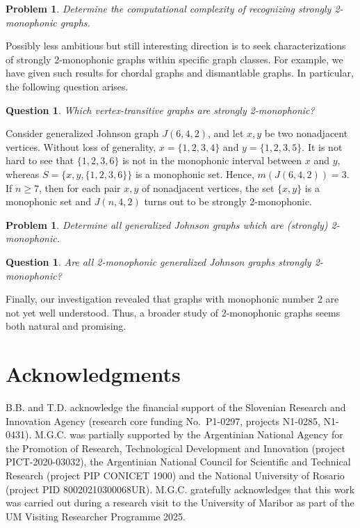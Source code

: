 \documentclass[a4paper,11pt]{article}
\newtheorem{problem}[theorem]{Problem}
\newtheorem{question}[theorem]{Question}
\begin{document}
\begin{problem}
    Determine the computational complexity of recognizing strongly 2-monophonic graphs.
\end{problem}


Possibly less ambitious but still interesting direction is to seek characterizations of strongly 2-monophonic graphs within specific graph classes. For example, we have given such results  for chordal graphs and dismantlable graphs. In particular, the following question arises. 

\begin{question}
    Which vertex-transitive graphs are strongly 2-monophonic? 
\end{question}

Consider generalized Johnson graph $J(6,4,2)$, and let $x,y$ be two nonadjacent vertices. Without loss of generality, $x=\{1,2,3,4\}$ and $y=\{1,2,3,5\}$. It is not hard to see that $\{1,2,3,6\}$ is not in the monophonic interval between $x$ and $y$, whereas $S=\{x,y,\{1,2,3,6\}\}$ is a monophonic set. Hence, $m(J(6,4,2))=3$.
If $n\geq 7$, then for each pair $x,y$ of nonadjacent vertices, the set $\{x,y\}$ is a monophonic set and $J(n,4,2)$ turns out to be strongly 2-monophonic.

\begin{problem}
    Determine all generalized Johnson graphs which are (strongly) 2-monophonic.
\end{problem}
\begin{question}
    Are all 2-monophonic generalized Johnson graphs strongly 2-monophonic?
\end{question}


Finally, our investigation revealed that graphs with monophonic number 2
are not yet well understood. Thus, a broader study of 2-monophonic graphs seems both natural and promising. 






\section*{Acknowledgments}
B.B. and T.D. acknowledge the financial support of the Slovenian Research and Innovation Agency (research core funding No.\ P1-0297, projects N1-0285, N1-0431).
M.G.C. was partially supported by the Argentinian National Agency for the Promotion of Research, Technological Development and Innovation (project PICT-2020-03032), the Argentinian National Council for Scientific and Technical Research (project PIP CONICET 1900) and the National University of Rosario (project PID 80020210300068UR).
M.G.C. gratefully acknowledges that this work was carried out during a research visit to the University of Maribor as part of the UM Visiting Researcher Programme 2025.




\end{document}
